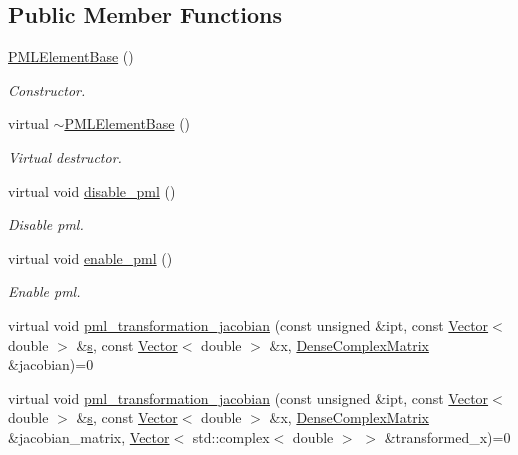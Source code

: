 \subsection*{Public Member Functions}
\begin{DoxyCompactItemize}
\item 
\hyperlink{classoomph_1_1PMLElementBase_ad29eae1793cca20aafa774086da1fc47}{P\+M\+L\+Element\+Base} ()
\begin{DoxyCompactList}\small\item\em Constructor. \end{DoxyCompactList}\item 
virtual \hyperlink{classoomph_1_1PMLElementBase_a2a9399aa63600f5276e865dde49f164a}{$\sim$\+P\+M\+L\+Element\+Base} ()
\begin{DoxyCompactList}\small\item\em Virtual destructor. \end{DoxyCompactList}\item 
virtual void \hyperlink{classoomph_1_1PMLElementBase_a751943790221819c111da99455275bbc}{disable\+\_\+pml} ()
\begin{DoxyCompactList}\small\item\em Disable pml. \end{DoxyCompactList}\item 
virtual void \hyperlink{classoomph_1_1PMLElementBase_a4eb9bdef561b94ba2e9b515bad6ccf57}{enable\+\_\+pml} ()
\begin{DoxyCompactList}\small\item\em Enable pml. \end{DoxyCompactList}\item 
virtual void \hyperlink{classoomph_1_1PMLElementBase_a770d8de20d8ae2d55f5f006052a39b3f}{pml\+\_\+transformation\+\_\+jacobian} (const unsigned \&ipt, const \hyperlink{classoomph_1_1Vector}{Vector}$<$ double $>$ \&\hyperlink{cfortran_8h_ab7123126e4885ef647dd9c6e3807a21c}{s}, const \hyperlink{classoomph_1_1Vector}{Vector}$<$ double $>$ \&x, \hyperlink{classoomph_1_1DenseComplexMatrix}{Dense\+Complex\+Matrix} \&jacobian)=0
\item 
virtual void \hyperlink{classoomph_1_1PMLElementBase_a4b9d6d74aa15e6395590b27686477b20}{pml\+\_\+transformation\+\_\+jacobian} (const unsigned \&ipt, const \hyperlink{classoomph_1_1Vector}{Vector}$<$ double $>$ \&\hyperlink{cfortran_8h_ab7123126e4885ef647dd9c6e3807a21c}{s}, const \hyperlink{classoomph_1_1Vector}{Vector}$<$ double $>$ \&x, \hyperlink{classoomph_1_1DenseComplexMatrix}{Dense\+Complex\+Matrix} \&jacobian\+\_\+matrix, \hyperlink{classoomph_1_1Vector}{Vector}$<$ std\+::complex$<$ double $>$ $>$ \&transformed\+\_\+x)=0

\end{DoxyCompactItemize}
